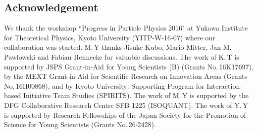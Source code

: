 \documentclass[a4paper,preprint,superscriptaddress,preprintnumbers,nofootinbib]{revtex4}
\begin{document}
\subsection*{Acknowledgement}
We thank the workshop ``Progress in Particle Physics 2016"  at Yukawa Institute for Theoretical Physics, Kyoto University
(YITP-W-16-07) where our collaboration was started.
M.\,Y thanks Jisuke Kubo, Mario Mitter, Jan M. Pawlowski and Fabian Rennecke for valuable discussions.
The work of K.\,T is supported by JSPS Grant-in-Aid for Young Scientists (B) (Grants No.\,16K17697), by the MEXT Grant-in-Aid for Scientific Research on Innovation Areas (Grants No.\,16H00868), and by Kyoto University: Supporting Program for Interaction-based Initiative Team Studies (SPIRITS).
The work of M.\,Y is supported by the DFG Collaborative Research Centre SFB 1225 (ISOQUANT).
The work of Y.\,Y is supported by Research Fellowships of the Japan Society for the Promotion of Science for Young Scientists (Grants No.\,26$\cdot$2428).
\end{document}
